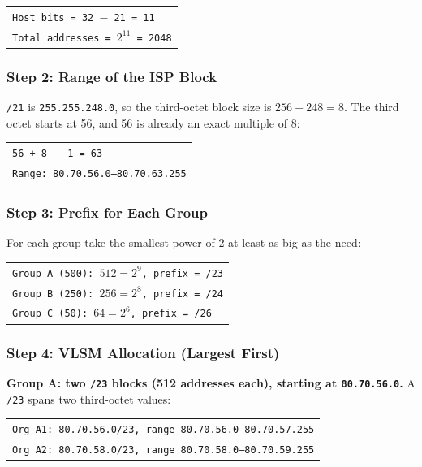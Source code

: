 \documentclass[11pt,a4paper]{article}
\begin{document}
\begin{tabularx}{\textwidth}{@{}X@{}}
\texttt{Host bits = 32 $-$ 21 = 11} \\
\texttt{Total addresses = $2^{11}$ = 2048} \\
\end{tabularx}

\subsubsection*{Step 2: Range of the ISP Block}

\texttt{/21} is \texttt{255.255.248.0}, so the third-octet block size is
$256 - 248 = 8$. The third octet starts at 56, and 56 is already an exact
multiple of 8:

\begin{tabularx}{\textwidth}{@{}X@{}}
\texttt{56 + 8 $-$ 1 = 63} \\
\texttt{Range: 80.70.56.0--80.70.63.255} \\
\end{tabularx}

\subsubsection*{Step 3: Prefix for Each Group}

For each group take the smallest power of 2 at least as big as the need:

\begin{tabularx}{\textwidth}{@{}X@{}}
\texttt{Group A (500): $512 = 2^{9}$, prefix = /23} \\
\texttt{Group B (250): $256 = 2^{8}$, prefix = /24} \\
\texttt{Group C (50): $64 = 2^{6}$, prefix = /26} \\
\end{tabularx}

\subsubsection*{Step 4: VLSM Allocation (Largest First)}

\textbf{Group A: two \texttt{/23} blocks (512 addresses each), starting at
\texttt{80.70.56.0}.} A \texttt{/23} spans two third-octet values:

\begin{tabularx}{\textwidth}{@{}X@{}}
\texttt{Org A1: 80.70.56.0/23, range 80.70.56.0--80.70.57.255} \\
\texttt{Org A2: 80.70.58.0/23, range 80.70.58.0--80.70.59.255} \\
\end{tabularx}
\end{document}
